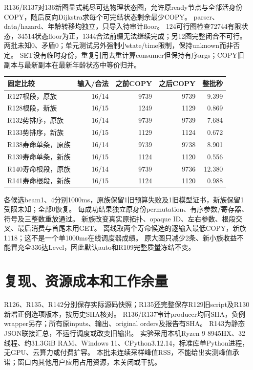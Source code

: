 \documentclass[UTF8,11pt,a4paper]{ctexart}
\begin{document}
R136/R137对136新图显式耗尽可达物理状态图，允许原ready节点与全部活身份COPY，随后反向Dijkstra求每个可完结状态剩余最少COPY。
parser、data/hazard、年龄转移均独立，只导入待审计floor。
124可行图检查72744有限状态，34514状态floor为正，1344合法前缀无法继续完成；另12图完整闭合不可行。
两批未知0、矛盾0；单元测试另外强制小state/time限制，保持unknown而非否定。
SET没有临时身份，重复引用去重计算consumer但保持有序args；COPY旧副本与最新副本在最新年龄状态中等价归并。

\begin{center}
\begin{tabular}{lrrrr}
\toprule
固定比较&输入/合法&之前COPY&之后COPY&整批秒\\
\midrule
R127根段，原族&16/14&9739&9739&9.399\\
R128根段，新族&16/15&1249&1129&0.869\\
R132势排序，原族&16/14&9739&9739&7.684\\
R133势排序，新族&16/15&1129&1124&0.672\\
R138寿命单条，原族&16/14&9739&9738&8.901\\
R139寿命单条，新族&16/15&1124&1120&0.556\\
R140寿命根段，原族&16/14&9739&9736&12.380\\
R141寿命根段，新族&16/15&1124&1120&0.988\\
\bottomrule
\end{tabular}
\end{center}
各候选beam1、4分别1000ms，原族保留1旧预算失败及1旧模型证书，新族保留1受限未知；全部0恢复。
每成功结果独立原身份permutation、有序参数/寄存器、符号及三整数重放通过。
新族改变真实原拓扑、opaque ID、左右参数、根段交叉、最后消费与首尾未用GET。
离线取两个寿命候选的逐输入最低COPY，新族1118；这不是一个单1000ms在线调度器成绩。
原大图只减少2条、新小族收益不能冒充全336达Level，因此默认auto和R109完整质量冻结不变。

\section{复现、资源成本和工作余量}
R126、R135、R142分别保存实际源码快照；R135还完整保存R129旧script及R130新增正例选项版本，按历史SHA核对。
R136/R137审计producer均同SHA，负例wrapper另存；所有原inputs、输出、original orders及报告有SHA。
R143为静态JSON联接汇总，不运行调度或改变旧输出。
实验采用本机Ryzen 9 8945HX、32线程、约31.3GiB RAM、Windows 11、CPython3.12.14，标准库单Python进程，无GPU、云算力或付费扩容。
本批未连续采样峰值RSS，不能给出实测峰值承诺；窗口内其他用户应用占用资源，未关闭或干扰。
\end{document}
